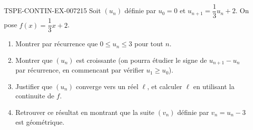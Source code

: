\begin{exercice}{TSPE-CONTIN-EX-007}{2}{15}
Soit $(u_n)$ définie par $u_0 = 0$ et $u_{n+1} = \dfrac{1}{3}u_n + 2$. On pose $f(x) = \dfrac{1}{3}x + 2$.
\begin{enumerate}
  \item Montrer par récurrence que $0 \leq u_n \leq 3$ pour tout $n$.
  \item Montrer que $(u_n)$ est croissante (on pourra étudier le signe de $u_{n+1}-u_n$ par récurrence, en commencant par vérifier $u_1 \geq u_0$).
  \item Justifier que $(u_n)$ converge vers un réel $\ell$, et calculer $\ell$ en utilisant la continuite de $f$.
  \item Retrouver ce résultat en montrant que la suite $(v_n)$ définie par $v_n = u_n - 3$ est géométrique.
\end{enumerate}
\end{exercice}
